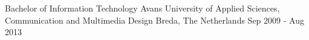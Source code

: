 

\begin{cventries}

  \cventry
    {Bachelor of Information Technology} %
    {Avans University of Applied Sciences, Communication and Multimedia Design} %
    {Breda, The Netherlands} %
    {Sep 2009 - Aug 2013} %
    {
      \begin{cvitems} %
      \end{cvitems}
    }
    {}

\end{cventries}
